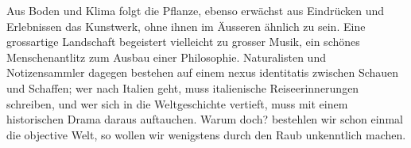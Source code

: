 Aus Boden und Klima folgt die Pflanze, ebenso erwächst aus Eindrücken und Erlebnissen das Kunstwerk, ohne ihnen im Äusseren ähnlich zu sein. Eine grossartige Landschaft begeistert vielleicht zu grosser Musik, ein schönes Menschenantlitz zum Ausbau einer Philosophie. Naturalisten und Notizensammler dagegen bestehen auf einem nexus identitatis zwischen Schauen und Schaffen; wer nach Italien geht, muss italienische Reiseerinnerungen schreiben, und wer sich in die Weltgeschichte vertieft, muss mit einem historischen Drama daraus auftauchen. Warum doch? bestehlen wir schon einmal die objective Welt, so wollen wir wenigstens durch  den Raub unkenntlich machen.
\par

